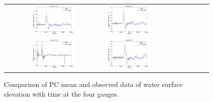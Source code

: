 \begin{figure}[ht]
\begin{tabular}{clc}
%        
\includegraphics[width=0.475\textwidth]{./figures/compare1.pdf} &
\includegraphics[width=0.475\textwidth]{./figures/compare2.pdf} \\
\includegraphics[width=0.475\textwidth]{./figures/compare3.pdf} &
\includegraphics[width=0.475\textwidth]{./figures/compare4.pdf}
\end{tabular}
\caption{Comparison of PC mean 
and observed data of water surface elevation with time at the four gauges.}
\label{fig:compare}
\end{figure}  
